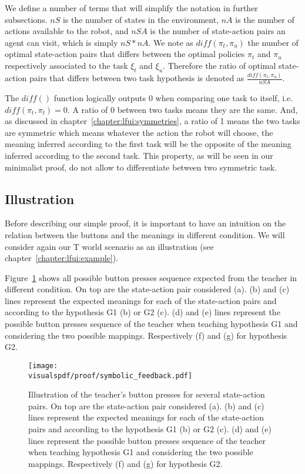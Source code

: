 We define a number of terms that will simplify the notation in further subsections. $nS$ is the number of states in the environment, $nA$ is the number of actions available to the robot, and $nSA$ is the number of state-action pairs an agent can visit, which is simply $nS * nA$. We note as $diff(\pi_t, \pi_u)$ the number of optimal state-action pairs that differs between the optimal policies $\pi_t$ and $\pi_u$ respectively associated to the task $\xi_t$ and $\xi_u$. Therefore the ratio of optimal state-action pairs that differs between two task hypothesis is denoted as $\frac{diff(\pi_t, \pi_u)}{nSA}$. 

The $diff()$ function logically outputs $0$ when comparing one task to itself, i.e. $diff(\pi_t, \pi_t) = 0$. A ratio of 0 between two tasks means they are the same. And, as discussed in chapter~\ref{chapter:lfui:symmetries}, a ratio of 1 means the two tasks are symmetric which means whatever the action the robot will choose, the meaning inferred according to the first task will be the opposite of the meaning inferred according to the second task. This property, as will be seen in our minimalist proof, do not allow to differentiate between two symmetric task.


\subsection{Illustration}

Before describing our simple proof, it is important to have an intuition on the relation between the buttons and the meanings in different condition. We will consider again our T world scenario as an illustration (see chapter~\ref{chapter:lfui:example}).


Figure~\ref{fig:proofsymbolic} shows all possible button presses sequence expected from the teacher in different condition. On top are the state-action pair considered (a). (b) and (c) lines represent the expected meanings for each of the state-action pairs and according to the hypothesis G1 (b) or G2 (c). (d) and (e) lines represent the possible button presses sequence of the teacher when teaching hypothesis G1 and considering the two possible mappings. Respectively (f) and (g) for hypothesis G2.

\begin{figure}[!ht]
\centering
\texttt{[image: \\visualspdf/proof/symbolic\_feedback.pdf]}
\caption{Illustration of the teacher's button presses for several state-action pairs. On top are the state-action pair considered (a). (b) and (c) lines represent the expected meanings for each of the state-action pairs and according to the hypothesis G1 (b) or G2 (c). (d) and (e) lines represent the possible button presses sequence of the teacher when teaching hypothesis G1 and considering the two possible mappings. Respectively (f) and (g) for hypothesis G2.}
\label{fig:proofsymbolic}
\end{figure} 

